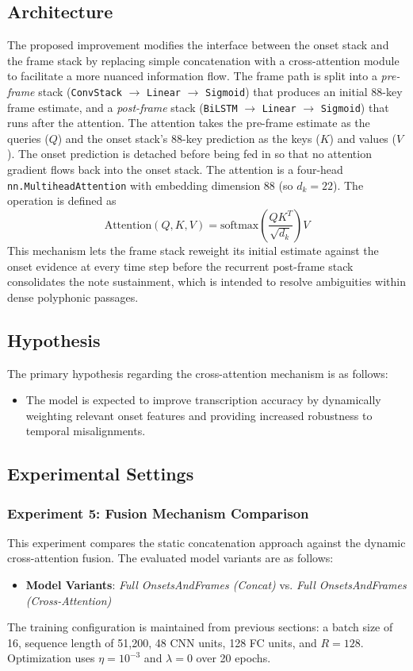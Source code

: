 \documentclass{article}
\begin{document}
\subsection{Architecture}
The proposed improvement modifies the interface between the onset stack and the frame stack by replacing simple concatenation with a cross-attention module to facilitate a more nuanced information flow. The frame path is split into a \textit{pre-frame} stack (\texttt{ConvStack} $\to$ \texttt{Linear} $\to$ \texttt{Sigmoid}) that produces an initial 88-key frame estimate, and a \textit{post-frame} stack (\texttt{BiLSTM} $\to$ \texttt{Linear} $\to$ \texttt{Sigmoid}) that runs after the attention. The attention takes the pre-frame estimate as the queries ($Q$) and the onset stack's 88-key prediction as the keys ($K$) and values ($V$). The onset prediction is detached before being fed in so that no attention gradient flows back into the onset stack. The attention is a four-head \texttt{nn.MultiheadAttention} with embedding dimension 88 (so $d_k = 22$). The operation is defined as
$$\text{Attention}(Q, K, V) = \text{softmax}\left(\frac{QK^T}{\sqrt{d_k}}\right)V$$
This mechanism lets the frame stack reweight its initial estimate against the onset evidence at every time step before the recurrent post-frame stack consolidates the note sustainment, which is intended to resolve ambiguities within dense polyphonic passages.

\subsection{Hypothesis}
The primary hypothesis regarding the cross-attention mechanism is as follows:
\begin{itemize}
    \item The model is expected to improve transcription accuracy by dynamically weighting relevant onset features and providing increased robustness to temporal misalignments.
\end{itemize}

\subsection{Experimental Settings}

\subsubsection{Experiment 5: Fusion Mechanism Comparison}
This experiment compares the static concatenation approach against the dynamic cross-attention fusion. The evaluated model variants are as follows:
\begin{itemize}
    \item \textbf{Model Variants}: \textit{Full OnsetsAndFrames (Concat)} vs. \textit{Full OnsetsAndFrames (Cross-Attention)}
\end{itemize}
The training configuration is maintained from previous sections: a batch size of 16, sequence length of 51,200, 48 CNN units, 128 FC units, and $R=128$. Optimization uses $\eta = 10^{-3}$ and $\lambda = 0$ over 20 epochs.
\end{document}
